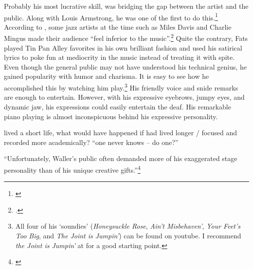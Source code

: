 \documentclass[11pt]{report}
\begin{document}
	\label{sec:charisma}
	Probably his most lucrative skill, was bridging the gap between the artist and the public. Along with Louis Armstrong, he was one of the first to do this.\footnote{\cite[3]{life}} According to \citeauthor{outside-insider}, some jazz artists at the time such as Miles Davis and Charlie Mingus made their audience ``feel inferior to the music''.\footnote{\cite[16]{outside-insider}.} Quite the contrary, Fats played Tin Pan Alley favorites in his own brilliant fashion and used his satirical lyrics to poke fun at mediocrity in the music instead of treating it with spite. Even though the general public may not have understood his technical genius, he gained popularity with humor and charisma. It is easy to see how he accomplished this by watching him play.\footnote{All four of his `soundies' (\emph{Honeysuckle Rose}, \emph{Ain't Misbehaven'}, \emph{Your Feet's Too Big}, and \emph{The Joint is Jumpin'}) can be found on youtube. I recommend \emph{the Joint is Jumpin'} at  for a good starting point.} His friendly voice and snide remarks are enough to entertain. However, with his expressive eyebrows, jumpy eyes, and dynamic jaw, his expressions could easily entertain the deaf. His remarkable piano playing is almost inconspicuous behind his expressive personality.


		

	\label{sec:conclusion}


	lived a short life, what would have happened if had lived longer / focused and recorded more academically? ``one never knows -- do one?''

	``Unfortunately, Waller's public often demanded more of his exaggerated stage personality than of his unique creative gifts.''\footnote{\cite[40]{grove-book:waller}}




		\nocite{anecdotes}
		\nocite{experience}
		\nocite{grove-book:waller}
		\nocite{jazz_scene}
		\nocite{life}
		\nocite{modernism}
		\nocite{outside-insider}
		\nocite{transcriptions}
		\nocite{visions}
		\nocite{web:machlin}
		\nocite{web:stride}
		\nocite{youtube-joint_is_jumpin}
			\printbibliography
\end{document}
